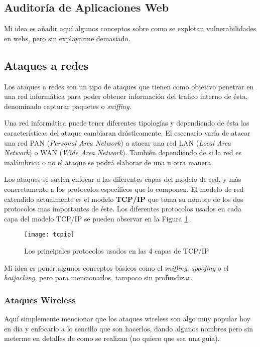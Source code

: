 \subsection{Auditoría de Aplicaciones Web}

{\color{red} Mi idea es añadir aquí algunos conceptos sobre como se explotan vulnerabilidades en webs, pero sin explayarme demasiado.}

\subsection{Ataques a redes}

Los ataques a redes son un tipo de ataques que tienen como objetivo penetrar en una red informática para poder obtener información del trafico interno de ésta, denominado capturar paquetes o \textit{sniffing}.

Una red informática puede tener diferentes tipologías y dependiendo de ésta las características del ataque cambiaran drásticamente. El escenario varía de atacar una red PAN (\textit{Personal Area Network}) a atacar una red LAN (\textit{Local Area Network}) o WAN (\textit{Wide Area Network}). También dependiendo de si la red es inalámbrica o no el ataque se podrá elaborar de una u otra manera.

Los ataques se suelen enfocar a las diferentes capas del modelo de red, y más concretamente a los protocolos específicos que lo componen. El modelo de red extendido actualmente es el modelo \textbf{TCP/IP} que toma su nombre de los dos protocolos mas importantes de éste. Los diferentes protocolos usados en cada capa del modelo TCP/IP se pueden observar en la Figura \ref{fig:tcpip}.

\begin{figure}[H]
	\centering
	\texttt{[image: tcpip]}
	\caption{Los principales protocolos usados en las 4 capas de TCP/IP}
	\label{fig:tcpip}
\end{figure}

{\color{red} Mi idea es poner algunos conceptos básicos como el \textit{sniffing}, \textit{spoofing} o el \textit{haijacking}, pero para mencionarlos, tampoco sin profundizar.}

\subsubsection{Ataques Wireless}

{\color{red} Aquí simplemente mencionar que los ataques wireless son algo muy popular hoy en dia y enfocarlo a lo sencillo que son hacerlos, dando algunos nombres pero sin meterme en detalles de como se realizan (no quiero que sea una guía).}

